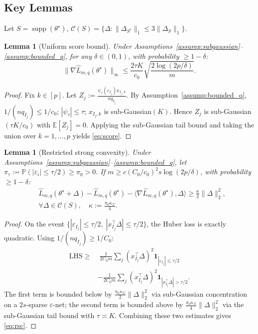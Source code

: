 \documentclass[10pt]{article}
\newtheorem{lemma}[theorem]{Lemma}
\newcommand{\E}{\mathbb{E}}
\newcommand{\Prob}{\mathbb{P}}
\newcommand{\hL}{\hat{L}}
\newcommand{\ts}{\theta^{\star}}
\begin{document}
\subsection{Key Lemmas}

Let $S=\operatorname{supp}(\ts)$,
$\mathcal{C}(S)=\{\Delta:\|\Delta_{S^c}\|_1\le3\|\Delta_S\|_1\}$.

\begin{lemma}[Uniform score bound]\label{lem:score}
Under Assumptions~\ref{assump:subgaussian}--\ref{assump:bounded_q},
for any $\delta\in(0,1)$, with probability $\ge1-\delta$:
\begin{equation}\label{eq:score}
  \|\nabla\hL_{m,q}(\ts)\|_\infty
  \le\frac{2\tau K}{c_0}\sqrt{\frac{2\log(2p/\delta)}{m}}.
\end{equation}
\end{lemma}
\begin{proof}
Fix $k\in[p]$. Let $Z_j:=\frac{\psi_\tau(\varepsilon_{I_j})x_{I_j,k}}{nq_{I_j}}$.
By Assumption~\ref{assump:bounded_q}, $1/(nq_{I_j})\le1/c_0$;
$|\psi_\tau|\le\tau$; $x_{I_j,k}$ is sub-Gaussian$(K)$.
Hence $Z_j$ is sub-Gaussian$(\tau K/c_0)$ with $\E[Z_j]=0$.
Applying the sub-Gaussian tail bound and taking the union over $k=1,\ldots,p$
yields \eqref{eq:score}.
\end{proof}

\begin{lemma}[Restricted strong convexity]\label{lem:rsc}
Under Assumptions~\ref{assump:subgaussian}--\ref{assump:bounded_q},
let $\pi_\tau:=\Prob(|\varepsilon_i|\le\tau/2)\ge\pi_0>0$.
If $m\ge c(C_0/c_0)^2s\log(2p/\delta)$, with probability $\ge1-\delta$:
\begin{align}
  &\hL_{m,q}(\ts\!+\!\Delta)-\hL_{m,q}(\ts)
  -\langle\nabla\hL_{m,q}(\ts),\Delta\rangle
  \ge\frac{\kappa}{2}\|\Delta\|_2^2,\label{eq:rsc}\\
  &\forall\Delta\in\mathcal{C}(S),\quad\kappa:=\frac{\pi_0\kappa_\Sigma}{4}.\nonumber
\end{align}
\end{lemma}
\begin{proof}
On the event $\{|\varepsilon_{I_j}|\le\tau/2,\;|x_{I_j}^\top\Delta|\le\tau/2\}$,
the Huber loss is exactly quadratic. Using $1/(nq_{I_j})\ge1/C_0$:
\begin{align*}
  \mathrm{LHS}\ge&\;
  \frac{1}{2C_0m}\sum_j(x_{I_j}^\top\Delta)^2\mathbf{1}_{|\varepsilon_{I_j}|\le\tau/2}
  \\&-\frac{1}{2C_0m}\sum_j(x_{I_j}^\top\Delta)^2\mathbf{1}_{|x_{I_j}^\top\Delta|>\tau/2}.
\end{align*}
The first term is bounded below by $\frac{\pi_0\kappa_\Sigma}{2}\|\Delta\|_2^2$
via sub-Gaussian concentration on a $2s$-sparse $\varepsilon$-net; the second term
is bounded above by $\frac{\pi_0\kappa_\Sigma}{4}\|\Delta\|_2^2$ via the
sub-Gaussian tail bound with $\tau\asymp K$. Combining these two estimates
gives \eqref{eq:rsc}.
\end{proof}
\end{document}
